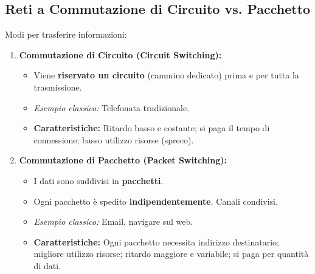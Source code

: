 \documentclass{article}
\begin{document}
\subsection{Reti a Commutazione di Circuito vs. Pacchetto}
Modi per trasferire informazioni:
\begin{enumerate}
    \item \textbf{Commutazione di Circuito (Circuit Switching):}
    \begin{itemize}
        \item Viene \textbf{riservato un circuito} (cammino dedicato) prima e per tutta la trasmissione.
        \item \textit{Esempio classico:} Telefonata tradizionale.
        \item \textbf{Caratteristiche:} Ritardo basso e costante; si paga il tempo di connessione; basso utilizzo risorse (spreco).
    \end{itemize}
    \item \textbf{Commutazione di Pacchetto (Packet Switching):}
    \begin{itemize}
        \item I dati sono suddivisi in \textbf{pacchetti}.
        \item Ogni pacchetto è spedito \textbf{indipendentemente}. Canali condivisi.
        \item \textit{Esempio classico:} Email, navigare sul web.
        \item \textbf{Caratteristiche:} Ogni pacchetto necessita indirizzo destinatario; migliore utilizzo risorse; ritardo maggiore e variabile; si paga per quantità di dati.
    \end{itemize}
\end{enumerate}
\end{document}
